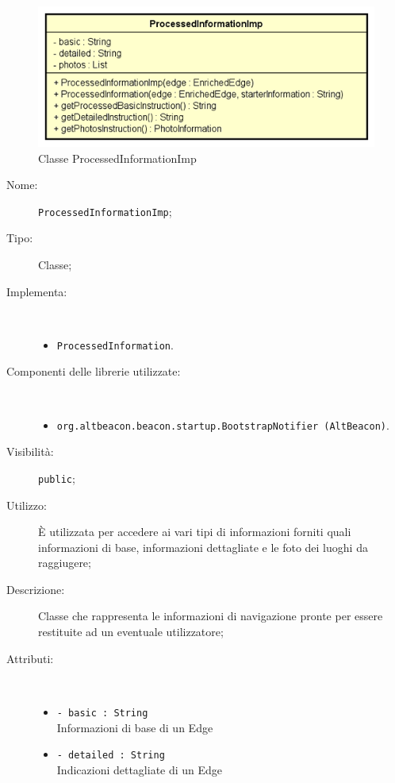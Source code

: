 \documentclass[../DefinizioneDiProdotto.tex]{subfiles}
\begin{document}
    \begin{figure}[H]
        \centering
        \includegraphics{img/ProcessedInformationImp.png}
        \caption{Classe ProcessedInformationImp}\label{fig:model::navigator::ProcessedInformationImp} 
    \end{figure}
    \begin{description}
\item[Nome:] \texttt{ProcessedInformationImp};
\item[Tipo:] Classe;
\item[Implementa:] \
\begin{itemize}
\item \texttt{ProcessedInformation}.

\end{itemize}
\item[Componenti delle librerie utilizzate:] \
\begin{itemize}
\item \texttt{org.altbeacon.beacon.startup.BootstrapNotifier (AltBeacon)}.

\end{itemize}
\item[Visibilità:] \texttt{public};
\item[Utilizzo:] È utilizzata per accedere ai vari tipi di informazioni forniti quali informazioni di base, informazioni dettagliate e le foto dei luoghi da raggiugere;
\item[Descrizione:] Classe che rappresenta le informazioni di navigazione pronte per essere restituite ad un eventuale utilizzatore;
\item[Attributi:] \
\begin{itemize}
\item \texttt{- basic : String}\\
Informazioni di base di un Edge

\item \texttt{- detailed : String}\\
Indicazioni dettagliate di un Edge


\end{itemize}
\end{description}
\end{document}
